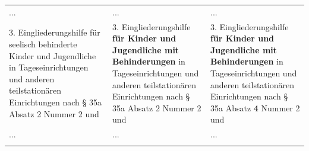 \documentclass[10pt,a4paper,landscape]{article}
\begin{document}
\begin{longtable}{|L{8.2cm}|L{8.2cm}|L{8.2cm}|}
\hhline{|---|}
... & ... & ... \\
\hhline{|---|}
3.   \newline Eingliederungshilfe für \textcolor{diffred}{seelisch behinderte}  \newline Kinder und Jugendliche in  \newline Tageseinrichtungen und anderen  \newline teilstationären Einrichtungen nach \S{} 35a  \newline Absatz \textcolor{diffred}{2} Nummer 2 und & 3.   \newline Eingliederungshilfe \textbf{für Kinder und  \newline Jugendliche mit Behinderungen} in  \newline Tageseinrichtungen und anderen  \newline teilstationären Einrichtungen nach \S{} 35a  \newline Absatz \textcolor{diffred}{2} Nummer 2 und & 3.   \newline Eingliederungshilfe \textbf{für Kinder und  \newline Jugendliche mit Behinderungen} in  \newline Tageseinrichtungen und anderen  \newline teilstationären Einrichtungen nach \S{} 35a  \newline Absatz \textbf{\textcolor{diffgreen}{4}} Nummer 2 und \\
\hhline{|---|}
... & ... & ... \\
\hhline{|---|}

\end{longtable}
\end{document}

